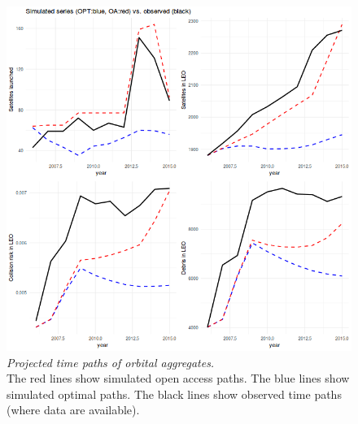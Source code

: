 \documentclass[12pt]{article}
\begin{document}
\begin{figure}[H]
	\centering
	\includegraphics[width=\textwidth]{../../images/32_pt_opt_simulated_historical_series.png}
	\captionsetup{format=hang}
	\caption{\textit{Projected time paths of orbital aggregates.} \\
		The red lines show simulated open access paths. The blue lines show simulated optimal paths. The black lines show observed time paths (where data are available).
	}
	\label{projected_path_of_states}
\end{figure}
\end{document}
